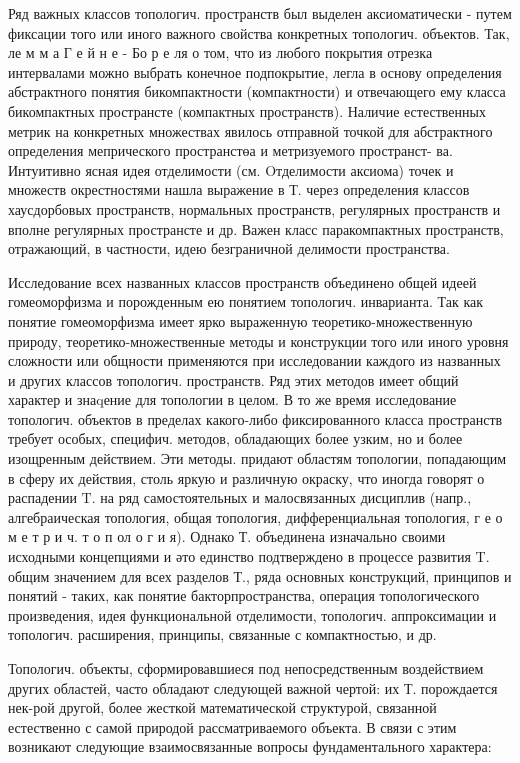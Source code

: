 \documentclass[10pt]{article}
\begin{document}
Ряд важных классов топологич. пространств был выделен аксиоматически - путем фиксации того или иного важного свойства конкретных топологич. объектов. Так, ле м м а $Г$ е й н е - Бо р е ля о том, что из любого покрытия отрезка интервалами можно выбрать конечное подпокрытие, легла в основу определения абстрактного понятия бикомпактности (компактности) и отвечающего ему класса бикомпактных пространсте (компактных пространств). Наличие естественных метрик на конкретных множествах явилось отправной точкой для абстрактного определения мепрического пространстөа и метризуемого пространст- ва. Интуитивно ясная идея отделимости (см. Oтделимости аксиома) точек и множеств окрестностями нашла выражение в Т. через определения классов хаусдорбовых пространств, нормальных пространств, регулярных пространств и вполне регулярных пространсте и др. Важен класс паракомпактных пространств, отражающий, в частности, идею безграничной делимости пространства.



Исследование всех названных классов пространств объединено общей идеей гомеоморфизма и порожденным ею понятием топологич. инварианта. Так как понятие гомеоморфизма имеет ярко выраженную теоретико-множественную природу, теоретико-множественные методы и конструкции того или иного уровня сложности или общности применяются при исследовании каждого из названных и других классов топологич. пространств. Ряд этих методов имеет общий характер и знаqение для топологии в целом. В то же время исследование топологич. объектов в пределах какого-либо фиксированного класса пространств требует особых, специфич. методов, обладающих более узким, но и более изощренным действием. Эти методы. придают областям топологии, попадающим в сферу их действия, столь яркую и различную окраску, что иногда говорят о распадении $\mathrm{T}$. на ряд самостоятельных и малосвязанных дисциплив (напр., алгебраическая топология, общая топология, дифференциальная топология, г е о м е т р и ч. т о п ол о г и я). Однако Т. объединена изначально своими исходными концепциями и әто единство подтверждено в процессе развития T. общим значением для всех разделов Т., ряда основных конструкций, принципов и понятий - таких, как понятие бакторпространства, операция топологического произведения, идея функциональной отделимости, топологич. аппроксимации и топологич. расширения, принципы, связанные с компактностью, и др.



Топологич. объекты, сформировавшиеся под непосредственным воздействием других областей, часто обладают следующей важной чертой: их Т. порождается нек-рой другой, более жесткой математической структурой, связанной естественно с самой природой рассматриваемого объекта. В связи с этим возникают следующие взаимосвязанные вопросы фундаментального характера:
\end{document}
